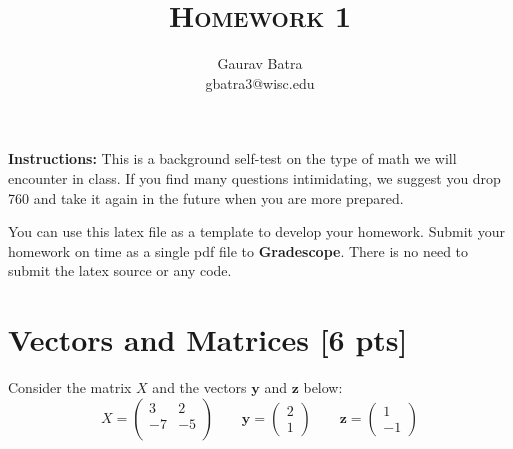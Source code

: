 \documentclass[letter]{article}
\title{\textsc{Homework 1}} %
\author{
	  Gaurav Batra \\
	gbatra3@wisc.edu\\
}
\date{}
\theoremstyle{definition}
\begin{document}
	
	\maketitle 
	
	
	\textbf{Instructions:} 
	This is a background self-test on the type of math we will encounter in class. If you find many questions intimidating, we suggest you drop 760 and take it again in the future when you are more prepared.
	
	You can use this latex file as a template to develop your homework.
	Submit your homework on time as a single pdf file to {\bf Gradescope}.
	There is no need to submit the latex source or any code.
	
	
	\section{Vectors and Matrices [6 pts]}
	Consider the matrix $X$ and the vectors $\mathbf{y}$ and $\textbf{z}$ below:
	$$
	X = \begin{pmatrix}
		3 & 2 \\ -7 & -5 \\
	\end{pmatrix}
	\qquad \mathbf{y} = \begin{pmatrix}
		2 \\ 1
	\end{pmatrix} \qquad \mathbf{z} = \begin{pmatrix}
		1 \\ -1
	\end{pmatrix}
	$$
\end{document}
